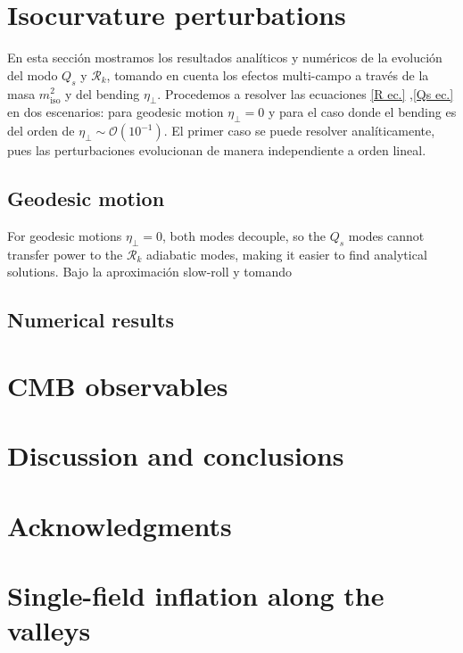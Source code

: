 \documentclass[12pt,a4paper,english,nofootinbib]{revtex4}
\begin{document}
\section{Isocurvature perturbations}
\label{{sec. 4}}

En esta sección mostramos los resultados analíticos y numéricos de la evolución del modo $Q_s$ y $\mathcal{R}_k$, tomando en cuenta los efectos multi-campo a través de la masa $m_\text{iso}^2$ y del bending $\eta_\perp$. Procedemos a resolver las ecuaciones \eqref{R ec.} ,\eqref{Qs ec.} en dos escenarios: para geodesic motion $\eta_\perp = 0$ y para el caso donde el bending es del orden de $\eta_\perp \sim \mathcal{O}(10^{-1})$. El primer caso se puede resolver analíticamente, pues las perturbaciones evolucionan de manera independiente a orden lineal. 




\subsection{Geodesic motion}

For geodesic motions $\eta_\perp = 0$, both modes decouple, so the $Q_s$ modes cannot transfer power to the $\mathcal{R}_k$ adiabatic modes, making it easier to find analytical solutions. Bajo la aproximación slow-roll y tomando 




\subsection{Numerical results}




\section{CMB observables}

\section{Discussion and conclusions}

\section{Acknowledgments}




\appendix

\section{Single-field inflation along the valleys 
\label{appendix1}}
\end{document}
